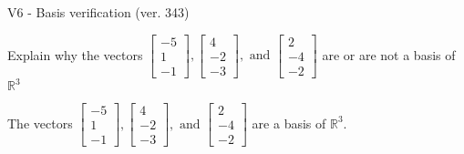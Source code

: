 \begin{exercise}
  \begin{exerciseTitle}V6 - Basis verification (ver. 343)\end{exerciseTitle}
  \begin{exerciseStatement}
    Explain why the vectors \(\left[\begin{array}{r}
-5 \\
1 \\
-1
\end{array}\right] , \left[\begin{array}{r}
4 \\
-2 \\
-3
\end{array}\right] , \text{ and } \left[\begin{array}{r}
2 \\
-4 \\
-2
\end{array}\right]\) are or are not a basis of \(\mathbb{R}^3\)	


  \end{exerciseStatement}
  \begin{exerciseAnswer}
   The vectors \(\left[\begin{array}{r}
-5 \\
1 \\
-1
\end{array}\right] , \left[\begin{array}{r}
4 \\
-2 \\
-3
\end{array}\right] , \text{ and } \left[\begin{array}{r}
2 \\
-4 \\
-2
\end{array}\right]\) 
  	 are  a basis of \(\mathbb{R}^3\).
  


  \end{exerciseAnswer}
\end{exercise}
